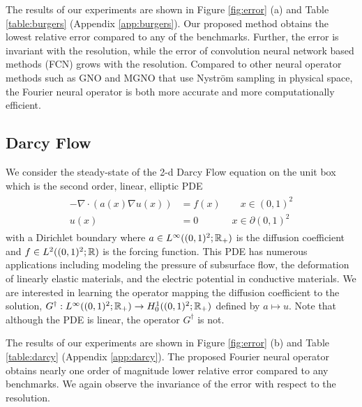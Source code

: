 \documentclass{article} %
\newcommand{\Ftrue}{G^\dagger}
\begin{document}
The results of our experiments are shown in Figure \ref{fig:error} (a) and Table \ref{table:burgers} (Appendix \ref{app:burgers}). Our proposed method obtains the lowest relative error compared to any of the benchmarks. Further, the error is invariant with the resolution, while the error of convolution neural network based methods (FCN) grows with the resolution. 
Compared to other neural operator methods such as GNO and MGNO that use Nystr\"om sampling in physical space, the Fourier neural operator is both more accurate and more computationally efficient.


\subsection{Darcy Flow}
\label{sec:darcy}
We consider the steady-state of the 2-d Darcy Flow equation on the unit box which is the second order, linear, elliptic PDE
\begin{align}\label{ssec:darcy}
\begin{split}
- \nabla \cdot (a(x) \nabla u(x)) &= f(x) \qquad x \in (0,1)^2 \\
u(x) &= 0 \qquad \quad \:\:x \in \partial (0,1)^2
\end{split}
\end{align}
with a Dirichlet boundary where $a \in L^\infty((0,1)^2;\mathbb{R}_+)$  is the diffusion coefficient and $f \in L^2((0,1)^2;\mathbb{R})$ is the forcing function. This PDE has numerous applications including modeling the pressure of subsurface flow, the deformation of linearly elastic materials, and the electric potential in conductive materials. We are interested in learning the operator mapping the diffusion coefficient to the solution, 
$\Ftrue: L^\infty((0,1)^2;\R_+) \to H^1_0 ((0,1)^2;\R_+)$ defined by $a \mapsto u$. Note that although the PDE is linear, the operator $\Ftrue$ is not.


The results of our experiments are shown in Figure \ref{fig:error} (b) and Table \ref{table:darcy} (Appendix \ref{app:darcy}). The proposed Fourier neural operator obtains nearly one order of magnitude lower relative error compared to any benchmarks. We again observe the invariance of the error with respect to the resolution. 
\end{document}

